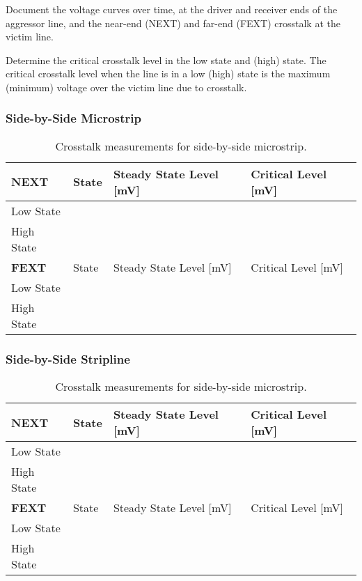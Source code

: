 \documentclass[../main.tex]{subfiles}
\begin{document}
\vspace{10pt}
Document the voltage curves over time, at the driver and receiver ends of the aggressor line, and the near-end (NEXT) and far-end (FEXT) crosstalk at the victim line.

\vspace{10pt}
Determine the critical crosstalk level in the low state and (high) state. The critical crosstalk level when the line is in a low (high) state is the maximum (minimum) voltage over the victim line due to crosstalk.

\solution

\subsubsection{Side-by-Side Microstrip}

\begin{table}[h]
    \centering
    \begin{tabular}{l|l l l}
        \toprule[1pt]
        \textbf{NEXT} & State & Steady State Level [mV] & Critical Level [mV] \\
        \midrule
        Low State & & & \\
        High State & & & \\
        \midrule[1pt]
        \textbf{FEXT} & State & Steady State Level [mV] & Critical Level [mV] \\
        \midrule
        Low State & & & \\
        High State & & & \\
        \bottomrule[1pt]
    \end{tabular}
    \caption{Crosstalk measurements for side-by-side microstrip.}
    \label{tab:sim-side-by-side-microstrip}
\end{table}

\subsubsection{Side-by-Side Stripline}

\begin{table}[h]
    \centering
    \begin{tabular}{l|l l l}
        \toprule[1pt]
        \textbf{NEXT} & State & Steady State Level [mV] & Critical Level [mV] \\
        \midrule
        Low State & & & \\
        High State & & & \\
        \midrule[1pt]
        \textbf{FEXT} & State & Steady State Level [mV] & Critical Level [mV] \\
        \midrule
        Low State & & & \\
        High State & & & \\
        \bottomrule[1pt]
    \end{tabular}
    \caption{Crosstalk measurements for side-by-side microstrip.}
    \label{tab:sim-side-by-side-stripline}
\end{table}
\end{document}
